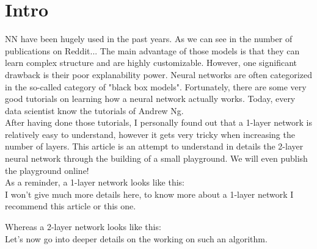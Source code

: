 \section{Intro}

NN have been hugely used in the past years. As we can see in the number of publications on Reddit... The main advantage of those models is that they can learn complex structure and are highly customizable. However, one significant drawback is their poor explanability power. Neural networks are often categorized in the so-called category of "black box models".
Fortunately, there are some very good tutorials on learning how a neural network actually works. Today, every data scientist know the tutorials of Andrew Ng. \\

After having done those tutorials, I personally found out that a 1-layer network is relatively easy to understand, however it gets very tricky when increasing the number of layers. This article is an attempt to understand in details the 2-layer neural network through the building of a small playground. We will even publish the playground online! \\

As a reminder, a 1-layer network looks like this: \\

I won't give much more details here, to know more about a 1-layer network I recommend this article or this one.


Whereas a 2-layer network looks like this: \\

Let's now go into deeper details on the working on such an algorithm.